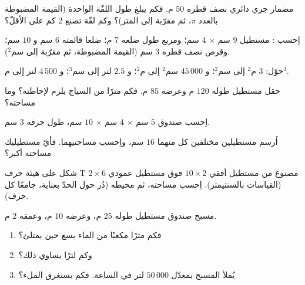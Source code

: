 \begin{exercise}[$\star$]\label{exo:g6:measure:3}
مضمار جري دائري نصف قطره $50$ م. فكم يبلغ طول اللفّة الواحدة
(القيمة المضبوطة بالعدد $\pi$، ثم مقرّبة إلى المتر)؟ وكم لفّة تصنع
$2$ كم على الأقلّ؟
\end{exercise}

\begin{exercise}[$\star$]\label{exo:g6:measure:4}
اِحسب : مستطيل $9$ سم $\times$ $4$ سم؛ ومربع طول
ضلعه $7$ م؛  ضلعا قائمته $6$ سم و $10$ سم؛ وقرص
نصف قطره $3$ سم (القيمة المضبوطة، ثم مقرّبة إلى سم$^2$).
\end{exercise}

\begin{exercise}[$\star$]\label{exo:g6:measure:5}
حوّل: $3$ م$^2$ إلى سم$^2$؛ و $45\,000$ سم$^2$ إلى م$^2$؛ و $2.5$ لتر
إلى سم$^3$؛ و $4\,500$ لتر إلى م$^3$.
\end{exercise}

\begin{exercise}[$\star$]\label{exo:g6:measure:6}
حقل مستطيل طوله $120$ م وعرضه $85$ م. فكم مترًا من السياج
يلزم لإحاطته؟ وما مساحته؟
\end{exercise}

\begin{exercise}[$\star$]\label{exo:g6:measure:7}
اِحسب  صندوق $5$ سم $\times$ $4$ سم $\times$ $10$ سم،
  طول حرفه $3$ سم.
\end{exercise}

\begin{exercise}[$\star$]\label{exo:g6:measure:8}
اُرسم مستطيلين مختلفين  كل منهما $16$ سم، واِحسب
مساحتيهما. فأيّ مستطيليك مساحته أكبر؟
\end{exercise}

\begin{exercise}[$\star\star$]\label{exo:g6:measure:9}
شكل على هيئة حرف T مصنوع من مستطيل أفقي $10 \times 2$ فوق
مستطيل عمودي $2 \times 6$ (القياسات بالسنتيمتر). اِحسب
مساحته، ثم محيطه (دُر حول الحدّ بعناية، جامعًا
كل حرف).
\end{exercise}

\begin{exercise}[$\star\star$]\label{exo:g6:measure:10}
مسبح صندوق مستطيل طوله $25$ م، وعرضه $10$ م، وعمقه
$2$ م.
\begin{enumerate}
  \item فكم مترًا مكعبًا من الماء يسع حين يمتلئ؟
  \item وكم لترًا يساوي ذلك؟
  \item يُملأ المسبح بمعدّل $50\,000$ لتر في الساعة. فكم يستغرق
        الملء؟
\end{enumerate}
\end{exercise}


